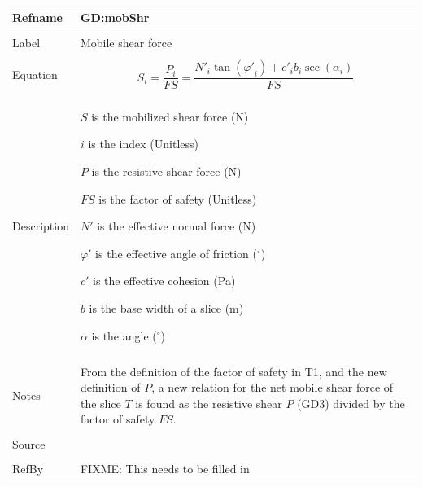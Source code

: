 \documentclass[12pt]{article}
\begin{document}
~\newline
\noindent \begin{minipage}{\textwidth}
\begin{tabular}{p{} p{}}
\toprule \textbf{Refname} & \textbf{GD:mobShr}
\label{GD:mobShr}
\\ \midrule \\
Label & Mobile shear force
\\ \midrule \\
Equation & \begin{dmath}
           S_{i}=\frac{P_{i}}{FS}=\frac{{N'}_{i} \tan\left({φ'}_{i}\right)+{c'}_{i} b_{i} \sec\left(α_{i}\right)}{FS}
           \end{dmath}
\\ \midrule \\
Description & \begin{symbDescription}
              \item{$S$ is the mobilized shear force (N)}
              \item{$i$ is the index (Unitless)}
              \item{$P$ is the resistive shear force (N)}
              \item{$FS$ is the factor of safety (Unitless)}
              \item{$N'$ is the effective normal force (N)}
              \item{$φ'$ is the effective angle of friction (${}^{\circ}$)}
              \item{$c'$ is the effective cohesion (Pa)}
              \item{$b$ is the base width of a slice (m)}
              \item{$α$ is the angle (${}^{\circ}$)}
              \end{symbDescription}
\\ \midrule \\
Notes & From the definition of the factor of safety in T1, and the new definition of $P$, a new relation for the net mobile shear force of the slice $T$ is found as the resistive shear $P$ (GD3) divided by the factor of safety $FS$.
\\ \midrule \\
Source &
\\ \midrule \\
RefBy & FIXME: This needs to be filled in
\\ \bottomrule \end{tabular}
\end{minipage}\\
\end{document}
